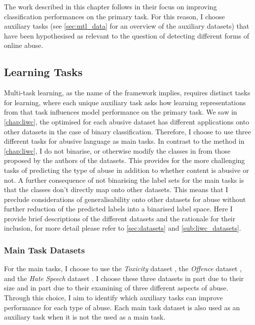 The work described in this chapter follows \citet{Rajamanickam:2020} in their focus on improving classification performances on the primary task.
For this reason, I choose auxiliary tasks (see \cref{sec:mtl_data} for an overview of the auxiliary datasets) that have been hypothesised as relevant to the question of detecting different forms of online abuse.

\subsection{Learning Tasks}\label{sec:mtl_tasks}

Multi-task learning, as the name of the framework implies, requires distinct tasks for learning, where each unique auxiliary task asks how learning representations from that task influences model performance on the primary task.
We saw in \cref{chap:liwc}, the optimised for each abusive dataset has different applications onto other datasets in the case of binary classification. Therefore, I choose to use three different tasks for abusive language as main tasks.
In contrast to the method in \cref{chap:liwc}, I do not binarise, or otherwise modify the classes in from those proposed by the authors of the datasets.
This provides for the more challenging tasks of predicting the type of abuse in addition to whether content is abusive or not.
A further consequence of not binarising the label sets for the main tasks is that the classes don't directly map onto other datasets.
This means that I preclude considerations of generalisability onto other datasets for abuse without further reduction of the predicted labels into a binarised label space.
Here I provide brief descriptions of the different datasets and the rationale for their inclusion, for more detail please refer to \cref{sec:datasets} and \cref{sub:liwc_datasets}.

\subsubsection{Main Task Datasets}
For the main tasks, I choose to use the \textit{Toxicity} dataset \citep{Wulczyn:2017}, the \textit{Offence} dataset \citep{Davidson:2017}, and the \textit{Hate Speech} dataset \citep{Waseem-Hovy:2016}. I choose these three datasets in part due to their size and in part due to their examining of three different aspects of abuse.
Through this choice, I aim to identify which auxiliary tasks can improve performance for each type of abuse.
Each main task dataset is also used as an auxiliary task when it is not the used as a main task.

